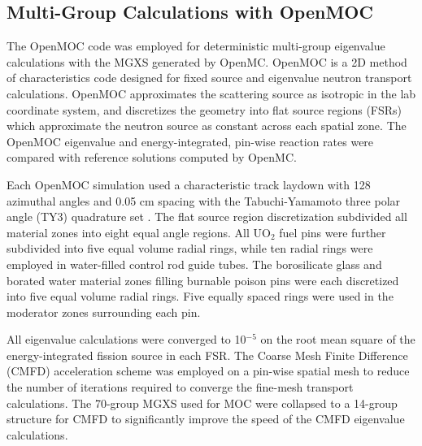 \subsection{Multi-Group Calculations with OpenMOC}
\label{subsec:openmoc}

The OpenMOC code was employed for deterministic multi-group eigenvalue calculations with the MGXS generated by OpenMC. OpenMOC is a 2D method of characteristics code designed for fixed source and eigenvalue neutron transport calculations. OpenMOC approximates the scattering source as isotropic in the lab coordinate system, and discretizes the geometry into flat source regions (FSRs) which approximate the neutron source as constant across each spatial zone. The OpenMOC eigenvalue and energy-integrated, pin-wise reaction rates were compared with reference solutions computed by OpenMC.

Each OpenMOC simulation used a characteristic track laydown with 128 azimuthal angles and 0.05 cm spacing with the Tabuchi-Yamamoto three polar angle (TY3) quadrature set \citep{yamamoto2007}. The flat source region discretization subdivided all material zones into eight equal angle regions. All UO$_2$ fuel pins were further subdivided into five equal volume radial rings, while ten radial rings were employed in water-filled control rod guide tubes. The borosilicate glass and borated water material zones filling burnable poison pins were each discretized into five equal volume radial rings. Five equally spaced rings were used in the moderator zones surrounding each pin.

All eigenvalue calculations were converged to 10$^{-5}$ on the root mean square of the energy-integrated fission source in each FSR. The Coarse Mesh Finite Difference (CMFD) acceleration scheme was employed on a pin-wise spatial mesh to reduce the number of iterations required to converge the fine-mesh transport calculations. The 70-group MGXS used for MOC were collapsed to a 14-group structure for CMFD to significantly improve the speed of the CMFD eigenvalue calculations.
